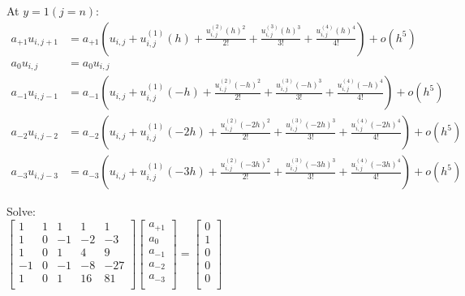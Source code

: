 \documentclass[12pt,letter]{article}
\begin{document}
\begin{enumerate}
\begin{enumerate}
    At $y=1 (j=n)$:
    \begin{align*}
      a_{+1} u_{i,j+1} & = a_{+1}(u_{i,j}+u_{i,j}^{(1)}(h)+ \frac{u_{i,j}^{(2)}(h)^2}{2!} + \frac{u_{i,j}^{(3)}(h)^3}{3!} + \frac{u_{i,j}^{(4)}(h)^4}{4!}) + o(h^5)\\
      a_{0} u_{i,j} & = a_{0} u_{i,j}\\
      a_{-1} u_{i,j-1} & = a_{-1}(u_{i,j}+u_{i,j}^{(1)}(-h)+ \frac{u_{i,j}^{(2)}(-h)^2}{2!} + \frac{u_{i,j}^{(3)}(-h)^3}{3!} + \frac{u_{i,j}^{(4)}(-h)^4}{4!}) + o(h^5)\\
      a_{-2} u_{i,j-2} & = a_{-2}(u_{i,j}+u_{i,j}^{(1)}(-2h)+ \frac{u_{i,j}^{(2)}(-2h)^2}{2!} + \frac{u_{i,j}^{(3)}(-2h)^3}{3!} + \frac{u_{i,j}^{(4)}(-2h)^4}{4!}) + o(h^5)\\
      a_{-3} u_{i,j-3} & = a_{-3}(u_{i,j}+u_{i,j}^{(1)}(-3h)+ \frac{u_{i,j}^{(2)}(-3h)^2}{2!} + \frac{u_{i,j}^{(3)}(-3h)^3}{3!} + \frac{u_{i,j}^{(4)}(-3h)^4}{4!}) + o(h^5)
    \end{align*}
    
    Solve:\\
    
    $
    \begin{bmatrix}
      1 & 1 & 1 & 1 & 1\\
      1 & 0 & -1 & -2 & -3\\
      1 & 0 & 1 & 4 & 9\\
      -1 & 0 & -1 & -8 & -27\\
      1 & 0 & 1 & 16 & 81\\
    \end{bmatrix}
    \begin{bmatrix}
      a_{+1}\\
      a_{0}\\
      a_{-1}\\
      a_{-2}\\
      a_{-3}\\
    \end{bmatrix}=
    \begin{bmatrix}
      0\\
      1\\
      0\\
      0\\
      0\\
    \end{bmatrix}
    $\\


\end{enumerate}
\end{enumerate}
\end{document}
